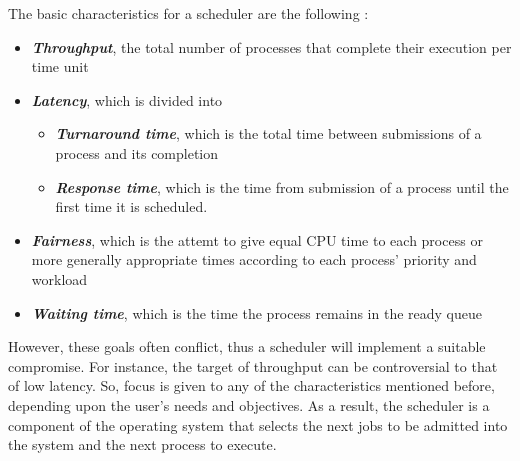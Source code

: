 \documentclass[diploma]{Styles/softlab-thesis}
\begin{document}
The basic characteristics for a scheduler are the following :
\begin{itemize}
	\item \textbf{\emph{Throughput}}, the total number of processes that complete their execution per time unit
	\item \textbf{\emph{Latency}}, which is divided into
		\begin{itemize}
			\item \textbf{\emph{Turnaround time}}, which is the total time between submissions of a process and its completion
			\item \textbf{\emph{Response time}}, which is the time from submission of a process until the first time it is scheduled.
		\end{itemize}
	\item \textbf{\emph{Fairness}}, which is the attemt to give equal CPU time to each process or more generally appropriate times according to each process' priority and workload
	\item \textbf{\emph{Waiting time}}, which is the time the process remains in the ready queue
\end{itemize}

However, these goals often conflict, thus a scheduler will implement a suitable compromise. For instance, the target of throughput can be controversial to that of low latency. So, focus is given to any of the characteristics mentioned before, depending upon the user's needs and objectives. As a result, the scheduler is a component of the operating system that selects the next jobs to be admitted into the system and the next process to execute. \\
\end{document}
